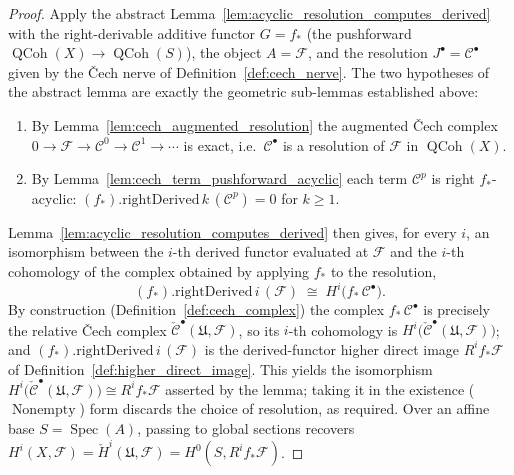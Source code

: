 \begin{proof}
  \leanok
  Apply the abstract Lemma~\ref{lem:acyclic_resolution_computes_derived} with the
  right-derivable additive functor \(G = f_*\)
  (the pushforward \(\operatorname{QCoh}(X) \to \operatorname{QCoh}(S)\)), the object
  \(A = \mathcal{F}\), and the resolution \(J^\bullet = \mathcal{C}^\bullet\) given by
  the {\v C}ech nerve of Definition~\ref{def:cech_nerve}. The two hypotheses of the
  abstract lemma are exactly the geometric sub-lemmas established above:
  \begin{enumerate}
    \item By Lemma~\ref{lem:cech_augmented_resolution} the augmented {\v C}ech
      complex \(0 \to \mathcal{F} \to \mathcal{C}^0 \to \mathcal{C}^1 \to \cdots\) is
      exact, i.e.\ \(\mathcal{C}^\bullet\) is a resolution of \(\mathcal{F}\) in
      \(\operatorname{QCoh}(X)\).
    \item By Lemma~\ref{lem:cech_term_pushforward_acyclic} each term
      \(\mathcal{C}^p\) is right \(f_*\)-acyclic:
      \((f_*).\mathrm{rightDerived}\,k\,(\mathcal{C}^p) = 0\) for \(k \geq 1\).
  \end{enumerate}
  Lemma~\ref{lem:acyclic_resolution_computes_derived} then gives, for every \(i\), an
  isomorphism between the \(i\)-th derived functor evaluated at \(\mathcal{F}\) and
  the \(i\)-th cohomology of the complex obtained by applying \(f_*\) to the
  resolution,
  \[
    (f_*).\mathrm{rightDerived}\,i\,(\mathcal{F})
      \;\cong\;
    H^i\bigl(f_*\,\mathcal{C}^\bullet\bigr).
  \]
  By construction (Definition~\ref{def:cech_complex}) the complex \(f_*\,
  \mathcal{C}^\bullet\) is precisely the relative {\v C}ech complex
  \(\check{\mathcal{C}}^\bullet(\mathfrak{U}, \mathcal{F})\), so its \(i\)-th
  cohomology is \(H^i\bigl(\check{\mathcal{C}}^\bullet(\mathfrak{U}, \mathcal{F})
  \bigr)\); and \((f_*).\mathrm{rightDerived}\,i\,(\mathcal{F})\) is the
  derived-functor higher direct image \(R^i f_*\mathcal{F}\) of
  Definition~\ref{def:higher_direct_image}. This yields the isomorphism
  \(H^i\bigl(\check{\mathcal{C}}^\bullet(\mathfrak{U}, \mathcal{F})\bigr) \cong
  R^i f_*\mathcal{F}\) asserted by the lemma; taking it in the existence
  (\(\operatorname{Nonempty}\)) form discards the choice of resolution, as required.
  Over an affine base \(S = \operatorname{Spec}(A)\), passing to global sections
  recovers \(H^i(X, \mathcal{F}) = \check{H}^i(\mathfrak{U}, \mathcal{F}) = H^0(S,
  R^i f_*\mathcal{F})\).
\end{proof}

